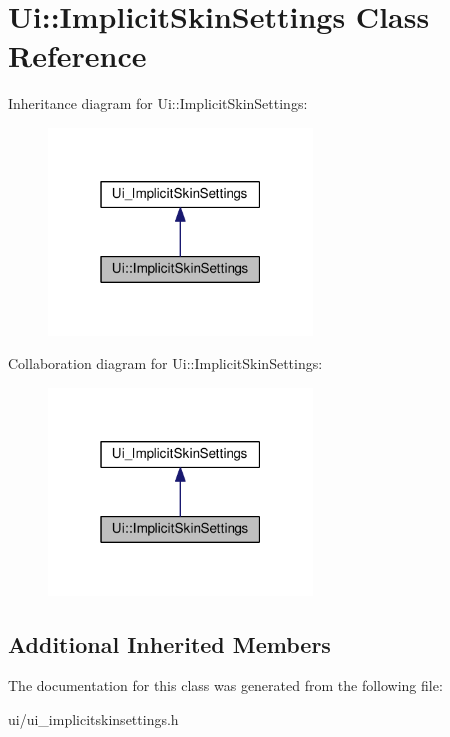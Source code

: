 \hypertarget{classUi_1_1ImplicitSkinSettings}{}\section{Ui\+:\+:Implicit\+Skin\+Settings Class Reference}
\label{classUi_1_1ImplicitSkinSettings}


Inheritance diagram for Ui\+:\+:Implicit\+Skin\+Settings\+:\nopagebreak
\begin{figure}[H]
\begin{center}
\leavevmode
\includegraphics[width=199pt]{d5/df1/classUi_1_1ImplicitSkinSettings__inherit__graph}
\end{center}
\end{figure}


Collaboration diagram for Ui\+:\+:Implicit\+Skin\+Settings\+:\nopagebreak
\begin{figure}[H]
\begin{center}
\leavevmode
\includegraphics[width=199pt]{db/dc5/classUi_1_1ImplicitSkinSettings__coll__graph}
\end{center}
\end{figure}
\subsection*{Additional Inherited Members}


The documentation for this class was generated from the following file\+:\begin{DoxyCompactItemize}
\item 
ui/ui\+\_\+implicitskinsettings.\+h\end{DoxyCompactItemize}

